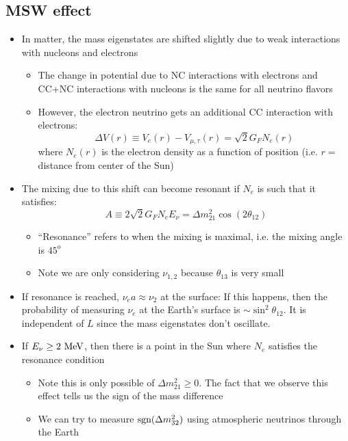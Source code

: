 \subsection{MSW effect}
\begin{itemize}
  \item In matter, the mass eigenstates are shifted slightly due to weak interactions with nucleons and electrons
  \begin{itemize}
    \item The change in potential due to NC interactions with electrons and CC+NC interactions with nucleons is the same for all neutrino flavors
    \item However, the electron neutrino gets an additional CC interaction with electrons:
    \begin{equation}
      \Delta V(r) \equiv V_e(r) - V_{\mu,\tau}(r) = \sqrt{2} G_F N_e(r)
    \end{equation}
    where $N_e(r)$ is the electron density as a function of position (i.e. $r=$ distance from center of the Sun)
  \end{itemize}
  \item The mixing due to this shift can become resonant if $N_e$ is such that it satisfies:
  \begin{equation}
    A \equiv 2\sqrt{2} G_F N_e E_\nu = \Delta m^2_{21}\cos(2\theta_{12})
  \end{equation}
  \begin{itemize}
    \item ``Resonance'' refers to when the mixing is maximal, i.e. the mixing angle is $45^o$
    \item Note we are only considering $\nu_{1,2}$ because $\theta_{13}$ is very small
  \end{itemize}
  \item If resonance is reached, $\nu_e a\approx \nu_2$ at the surface:
    If this happens, then the probability of measuring $\nu_e$ at the Earth's surface is $\sim\sin^2\theta_{12}$. It is independent of $L$ since the mass eigenstates don't oscillate.
  \item If $E_\nu \geq 2~\text{MeV}$, then there is a point in the Sun where $N_e$ satisfies the resonance condition
  \begin{itemize}
    \item Note this is only possible of $\Delta m_{21}^2 \geq 0$. The fact that we observe this effect tells us the sign of the mass difference
    \item We can try to measure $\text{sgn}(\Delta m_{32}^2)$ using atmospheric neutrinos through the Earth
  \end{itemize}
\end{itemize}

